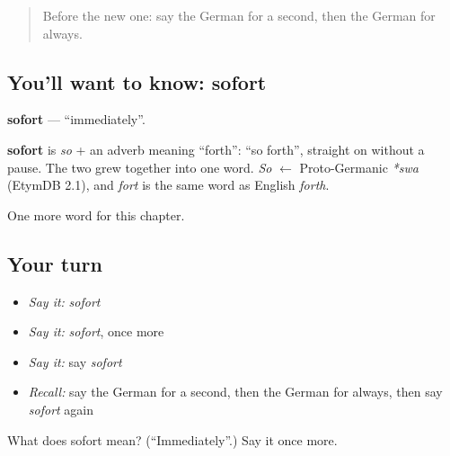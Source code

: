 \begin{quote}
Before the new one: say the German for a second, then the German for always.
\end{quote}

\subsection*{You'll want to know: sofort}
\textbf{sofort} — \textquotedblleft{}immediately\textquotedblright{}.

\begin{cousinweb}
\textbf{sofort} is \emph{so} + an adverb meaning \textquotedblleft{}forth\textquotedblright{}: \textquotedblleft{}so forth\textquotedblright{}, straight on without a pause. The two grew together into one word. \emph{So} $\leftarrow$ Proto-Germanic \emph{*swa} (EtymDB 2.1), and \emph{fort} is the same word as English \emph{forth}.
\end{cousinweb}

\begin{grammarlens}[title={What you've built}]
One more word for this chapter.
\end{grammarlens}

\subsection*{Your turn}
\begin{itemize}
\raggedright
  \item \emph{Say it:} \emph{sofort}
  \item \emph{Say it:} \emph{sofort}, once more
  \item \emph{Say it:} say \emph{sofort}
  \item \emph{Recall:} say the German for a second, then the German for always, then say \emph{sofort} again
\end{itemize}

\begin{tcolorbox}[breakable,colback=teal!4,colframe=teal!35!black,title={Before you move on}]
What does sofort mean? (\textquotedblleft{}Immediately\textquotedblright{}.) Say it once more.
\end{tcolorbox}
